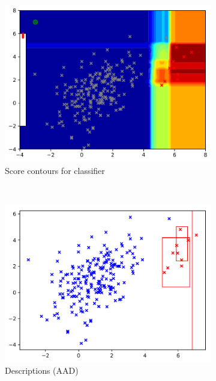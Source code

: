 \documentclass{article} %
\begin{document}
\begin{figure}
\begin{subfigure}[b]{0.3\textwidth}
    	\includegraphics[width=\textwidth, clip=true, trim=0mm 0mm 0mm 0mm]{avc_dataset_5_classifier}
    	\caption{Score contours for classifier}
    	\label{fig:rf}
    \end{subfigure}\\
    \begin{subfigure}[b]{0.3\textwidth}
    	\includegraphics[width=\textwidth, clip=true, trim=0mm 0mm 0mm 0mm]{avc_dataset_5_anomaly_descriptions}
    	\caption{Descriptions (AAD)}
    	\label{fig:dataset}
    \end{subfigure}
    \begin{subfigure}[b]{0.3\textwidth}

\end{subfigure}
\end{figure}
\end{document}
